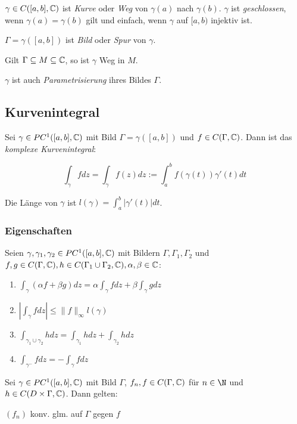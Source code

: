 $\gamma \in C([a,b],\mathbb{C})$ ist \emph{Kurve} oder \emph{Weg} von $\gamma(a)$ nach $\gamma(b)$. $\gamma$ ist \emph{geschlossen}, wenn $\gamma(a)=\gamma(b)$ gilt und einfach, wenn $\gamma$ auf $[a,b)$ injektiv ist.

$\Gamma = \gamma([a,b])$ ist \emph{Bild} oder \emph{Spur} von $\gamma$.

Gilt $\Gamma \subseteq M \subseteq \mathbb{C}$, so ist $\gamma$ Weg in $M$.

$\gamma$ ist auch \emph{Parametrisierung} ihres Bildes $\Gamma$.

\subsection*{Kurvenintegral}

Sei $\gamma \in PC^1([a,b],\mathbb{C})$ mit Bild $\Gamma = \gamma([a,b])$ und $f \in C(\Gamma,\mathbb{C})$. Dann ist das \emph{komplexe Kurvenintegral}:

\vspace*{-2mm}
$$\int_\gamma f dz = \int_\gamma f(z) dz := \int_a^b f(\gamma(t))\gamma'(t) dt$$

Die Länge von $\gamma$ ist $l(\gamma) = \int_a^b |\gamma'(t)| dt$.

\subsubsection*{Eigenschaften}

Seien $\gamma, \gamma_1, \gamma_2 \in PC^1([a,b],\mathbb{C})$ mit Bildern $\Gamma, \Gamma_1, \Gamma_2$ und $f, g \in C(\Gamma,\mathbb{C}), h \in C(\Gamma_1 \cup \Gamma_2, \mathbb{C}), \alpha, \beta \in \mathbb{C}$:

\begin{enumerate}[label=(\alph*)]
	\item $\int_\gamma (\alpha f + \beta g) dz = \alpha \int_\gamma f dz + \beta \int_\gamma g dz$
	\item $|\int_\gamma f dz| \leq \|f\|_\infty l(\gamma)$
	\item $\int_{\gamma_1 \cup \gamma_2} h dz = \int_{\gamma_1} h dz + \int_{\gamma_2} h dz$
	\item $\int_{\gamma^-} f dz = - \int_{\gamma} f dz$
\end{enumerate}

Sei $\gamma \in PC^1([a,b],\mathbb{C})$ mit Bild $\Gamma$, $f_n, f \in C(\Gamma,\mathbb{C})$ für $n \in \N$ und $h \in C(D\times\Gamma,\mathbb{C})$. Dann gelten:

\spacing

$(f_n)$ konv. glm. auf $\Gamma$ gegen $f$

